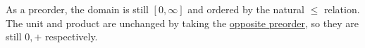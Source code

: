 As a preorder, the domain is still $[0,\infty]$ and ordered by the natural $\leq$ relation.  The unit and product are unchanged by taking the \hyperref[D1.58]{opposite preorder}, so they are still $0, +$ respectively.
